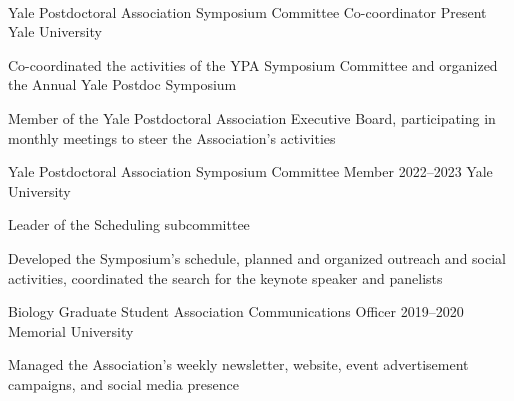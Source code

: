\\

\begin{cventries}

  \cventry
    {Yale Postdoctoral Association} %
    {Symposium Committee Co-coordinator} %
    {Present} %
    {Yale University} %
    {
      \begin{cvitems} %
        \item {Co-coordinated the activities of the YPA Symposium Committee and organized the Annual Yale Postdoc Symposium}
        \item {Member of the Yale Postdoctoral Association Executive Board, participating in monthly meetings to steer the Association's activities}
      \end{cvitems}
    }
  \cventry
    {Yale Postdoctoral Association} %
    {Symposium Committee Member} %
    {2022--2023} %
    {Yale University} %
    {
      \begin{cvitems} %
        \item {Leader of the Scheduling subcommittee}
        \item {Developed the Symposium's schedule, planned and organized outreach and social activities, coordinated the search for the keynote speaker and panelists}
      \end{cvitems}
    }

  \cventry
    {Biology Graduate Student Association} %
    {Communications Officer} %
    {2019--2020} %
    {Memorial University} %
    {
      \begin{cvitems} %
        \item {Managed the Association's weekly newsletter, website, event advertisement campaigns, and social media presence}
      \end{cvitems}
    }


\end{cventries}
